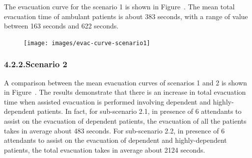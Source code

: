 \documentclass{style/llncs}
\begin{document}
\noindent{}The evacuation curve for the scenario 1 is shown in Figure~. The mean
total evacuation time of ambulant patients is about 383 seconds, with a
range of value between 163 seconds and 622 seconds.%

\begin{figure}[tbp]%
\begin{mdcenter}%

\noindent{}\texttt{[image: images/evac-curve-scenario1]}{}%

\mdhr{}%

\noindent{}%
\end{mdcenter}\label{fig-evac-curve-s1}%
\end{figure}%

\subsubsection{4.2.2.\hspace*{0.5em}Scenario 2}\label{path-s2}%

\noindent{}A comparison between the mean evacuation curves of scenarios 1 and 2
is shown in Figure~. The results demonstrate that there is an
increase in total evacuation time when assisted evacuation is performed
involving dependent and highly-dependent patients. In fact, for
sub-scenario 2.1, in presence of 6 attendants to assist on the evacuation
of dependent patients, the evacuation of all the patients takes in
average about 483 seconds. For sub-scenario 2.2, in presence of 6
attendants to assist on the evacuation of dependent and highly-dependent
patients, the total evacuation takes in average about 2124 seconds.%
\end{document}
